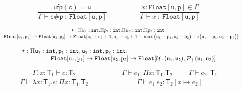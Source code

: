 \documentclass[11pt]{article}
\def\F#1#2{\mathtt{Float[#1,#2]}}
\begin{document}
$$
\frac{\mathsf{ufp}(\texttt{c})=u}
     {\Gamma \vdash \texttt{c\#p}\ :\ \F{u}{p} }
\hspace{2cm}
\frac{x : \F{u}{p} \in \Gamma}
     {\Gamma \vdash x\ :\ \F{u}{p} }
$$

$$\small
\begin{array}{c}
\texttt{+} : \Pi u_1:\texttt{int}. \Pi p_1:\texttt{int}.\Pi u_2:\texttt{int}. \Pi p_2:\texttt{int}.\\
\quad\F{u_1}{p_1}\rightarrow\F{u_2}{p_2}\rightarrow\F{u_1+u_2+1}{u_1+u_2+1-\max\big(\mathtt{u_1}-\mathtt{p_1},\mathtt{u_2}-\mathtt{p_2}\big)
-\iota\big(\mathtt{u_1}-\mathtt{p_1},\mathtt{u_2}-\mathtt{p_2}\big)
}
\end{array}
$$

$$\small
\begin{array}{l}
\texttt{+} : \Pi \mathtt{u_1}:\texttt{int}, \mathtt{p_1}:\texttt{int}, \mathtt{u_2}:\texttt{int}, \mathtt{p_2}:\texttt{int}.\\
\hspace{1.5cm}\F{u_1}{p_1}\rightarrow\F{u_2}{p_2}\rightarrow\F{\mathcal{U}_+(\mathtt{u_1},\mathtt{u_2})}{\mathcal{P}_+(\mathtt{u_1},\mathtt{u_2})}
\end{array}
$$


$$
\frac{\Gamma,x: \mathsf{T}_1 \vdash e :  \mathsf{T}_2}
     {\Gamma \vdash \lambda x:\mathsf{T}_1.e : \Pi x:\mathsf{T}_1 .  \mathsf{T}_2}
\hspace{2cm}
\frac{\Gamma \vdash e_1 : \Pi x: \mathsf{T}_1. \mathsf{T}_2\hspace{1cm} \Gamma \vdash e_2 :  \mathsf{T}_1}
     {\Gamma \vdash e_1\ e_2 :  \mathsf{T}_2[x\mapsto e_2]}
$$
\end{document}
